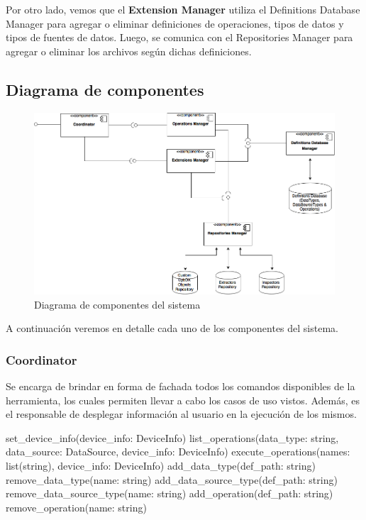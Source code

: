 Por otro lado, vemos que el \textbf{Extension Manager} utiliza el Definitions Database Manager para agregar o eliminar definiciones de operaciones, tipos de datos y tipos de fuentes de datos. Luego, se comunica con el Repositories Manager para agregar o eliminar los archivos según dichas definiciones.

\subsection{Diagrama de componentes}
\begin{figure}[H]
    \begin{center}
        \includegraphics[scale=0.40]{figures/diagrama_de_componentes}
        \caption{Diagrama de componentes del sistema}
        \label{DiagramaComponentes}
    \end{center}
\end{figure}

A continuación veremos en detalle cada uno de los componentes del sistema.

\subsubsection{Coordinator}
Se encarga de brindar en forma de fachada todos los comandos disponibles de la herramienta, los cuales permiten llevar a cabo los casos de uso vistos. Además, es el responsable de desplegar información al usuario en la ejecución de los mismos.
\newline

\begin{python}[title=Interfaz Coordinator, captionpos=b]
set_device_info(device_info: DeviceInfo)
list_operations(data_type: string, data_source: DataSource,
                device_info: DeviceInfo)
execute_operations(names: list(string), device_info: DeviceInfo)
add_data_type(def_path: string)
remove_data_type(name: string)
add_data_source_type(def_path: string)
remove_data_source_type(name: string)
add_operation(def_path: string)
remove_operation(name: string)
\end{python}

